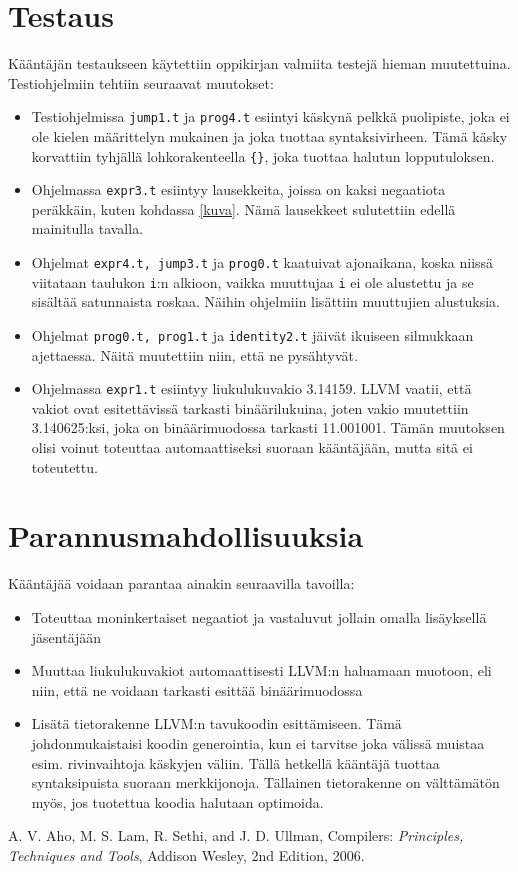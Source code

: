 \documentclass[12pt]{article}
\newcommand{\code}{\texttt}
\begin{document}
\section{Testaus}
Kääntäjän testaukseen käytettiin oppikirjan valmiita testejä hieman muutettuina. 
Testiohjelmiin tehtiin seuraavat muutokset:
\begin{itemize}
\item Testiohjelmissa \code{jump1.t} ja \code{prog4.t} esiintyi käskynä pelkkä puolipiste, 
joka ei ole kielen määrittelyn mukainen ja joka tuottaa syntaksivirheen. Tämä käsky korvattiin 
tyhjällä lohkorakenteella \code{\{\}}, joka tuottaa halutun lopputuloksen.

\item Ohjelmassa \code{expr3.t} esiintyy lausekkeita, joissa on kaksi negaatiota peräk\-käin, kuten 
kohdassa \ref{kuva}. Nämä lausekkeet sulutettiin edellä mainitulla tavalla. 

\item Ohjelmat \code{expr4.t, jump3.t} ja \code{prog0.t} kaatuivat ajonaikana, koska niissä 
viitataan taulukon \code{i}:n alkioon, vaikka muuttujaa \code{i} ei ole alustettu ja se 
sisältää satunnaista roskaa. Näihin ohjelmiin lisättiin muuttujien alustuksia.

\item Ohjelmat \code{prog0.t, prog1.t} ja \code{identity2.t} jäivät ikuiseen silmukkaan ajettaessa. 
Näitä muutettiin niin, että ne pysähtyvät.

\item Ohjelmassa \code{expr1.t} esiintyy liukulukuvakio 3.14159. LLVM vaatii, että vakiot ovat 
esitettävissä tarkasti binäärilukuina, joten vakio muutettiin 3.140625:ksi, joka on 
binäärimuodossa tarkasti 11.001001. Tämän muutoksen olisi voinut toteuttaa automaattiseksi suoraan 
kääntäjään, mutta sitä ei toteutettu. 
\end{itemize}

\section{Parannusmahdollisuuksia}
Kääntäjää voidaan parantaa ainakin seuraavilla tavoilla:
\begin{itemize}
\item Toteuttaa moninkertaiset negaatiot ja vastaluvut jollain omalla lisäyksellä 
jäsentäjään

\item Muuttaa liukulukuvakiot automaattisesti LLVM:n haluamaan muotoon, eli niin, että 
ne voidaan tarkasti esittää binäärimuodossa

\item Lisätä tietorakenne LLVM:n tavukoodin esittämiseen. Tämä johdonmukais\-taisi koodin 
generointia, kun ei tarvitse joka välissä muistaa esim. rivinvaihtoja käskyjen väliin. 
Tällä hetkellä kääntäjä tuottaa syntaksipuista suoraan merkkijonoja. Tällainen tietorakenne 
on välttämätön myös, jos tuotettua koodia halutaan optimoida. 
\end{itemize}

\begin{thebibliography}{9}
  A. V. Aho, M. S. Lam, R. Sethi, and J. D. Ullman,
  Compilers: \emph{Principles, Techniques and Tools}, 
  Addison Wesley,
  2nd Edition,
  2006.
\end{thebibliography}
\end{document}
